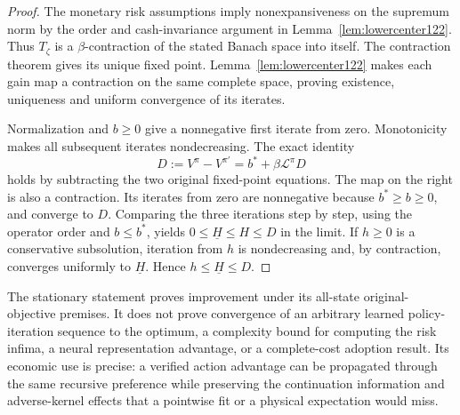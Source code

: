 \begin{proof}
The monetary risk assumptions imply nonexpansiveness on the supremum
norm by the order and cash-invariance argument in
Lemma~\ref{lem:lowercenter122}. Thus $T_\zeta$ is a $\beta$-contraction
of the stated Banach space into itself. The contraction theorem gives
its unique fixed point. Lemma~\ref{lem:lowercenter122} makes each
gain map a contraction on the same complete space, proving existence,
uniqueness and uniform convergence of its iterates.

Normalization and $b\ge0$ give a nonnegative first iterate from zero.
Monotonicity makes all subsequent iterates nondecreasing. The exact
identity
\[
 D:=V^\pi-V^{\pi'}=b^*+\beta\mathcal L^\pi D
\]
holds by subtracting the two original fixed-point equations.
The map on the right is also a contraction. Its iterates from zero
are nonnegative because $b^*\ge b\ge0$, and converge to $D$.
Comparing the three iterations step by step, using the operator order
and $b\le b^*$, yields $0\le\underline H\le H\le D$ in the limit.
If $h\ge0$ is a conservative subsolution, iteration from $h$ is
nondecreasing and, by contraction, converges uniformly to
$\underline H$. Hence $h\le\underline H\le D$.
\end{proof}

The stationary statement proves improvement under its all-state original-
objective premises. It does not prove convergence of an arbitrary learned
policy-iteration sequence to the optimum, a complexity bound for computing
the risk infima, a neural representation advantage, or a complete-cost
adoption result. Its economic use is precise: a verified action advantage
can be propagated through the same recursive preference while preserving
the continuation information and adverse-kernel effects that a pointwise
fit or a physical expectation would miss.
